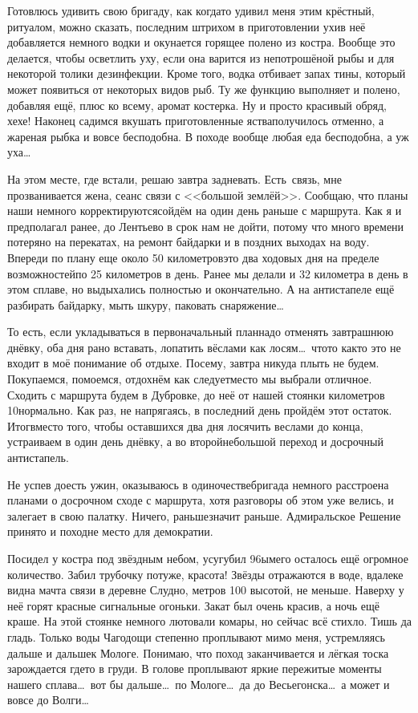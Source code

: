 Готовлюсь удивить свою бригаду, как когда\sdash то удивил меня этим крёстный, ритуалом, можно сказать, последним штрихом в приготовлении ухи\mdash в неё добавляется немного водки и окунается горящее полено из костра. Вообще это делается, чтобы осветлить уху, если она варится из непотрошёной рыбы и для некоторой толики дезинфекции. Кроме того, водка отбивает запах тины, который может появиться от некоторых видов рыб. Ту же функцию выполняет и полено, добавляя ещё, плюс ко всему, аромат костерка. Ну и просто красивый обряд, хе\sdash хе! Наконец садимся вкушать приготовленные яства\mdash получилось отменно, а жареная рыбка и вовсе бесподобна. В походе вообще любая еда бесподобна, а уж уха\ldots~

На этом месте, где встали, решаю завтра задневать. Есть~связь, мне прозванивается жена, сеанс связи с <<большой землёй>>. Сообщаю, что планы наши немного корректируются\mdash сойдём на один день раньше с маршрута. Как я и предполагал ранее, до Лентьево в срок нам не дойти, потому что много времени потеряно на перекатах, на ремонт байдарки и в поздних выходах на воду. Впереди по плану еще около 50 километров\mdash это два ходовых дня на пределе возможностей\mdash по 25 километров в день. Ранее мы делали и 32 километра в день в этом сплаве, но выдыхались полностью и окончательно. А на антистапеле ещё разбирать байдарку, мыть шкуру, паковать снаряжение\ldots~

То есть, если укладываться в первоначальный план\mdash надо отменять завтрашнюю днёвку, оба дня рано вставать, лопатить вёслами как лосям\ldots~что\sdash то как\sdash то это не входит в моё понимание об отдыхе. Посему, завтра никуда плыть не будем. Покупаемся, помоемся, отдохнём как следует\mdash место мы выбрали отличное. Сходить с маршрута будем в Дубровке, до неё от нашей стоянки километров 10\mdash нормально. Как раз, не напрягаясь, в последний день пройдём этот остаток. Итог\mdash вместо того, чтобы оставшихся два дня лосячить веслами до конца, устраиваем в один день днёвку, а во второй\mdash небольшой переход и досрочный антистапель. 

Не успев доесть ужин, оказываюсь в одиночестве\mdash бригада немного расстроена планами о досрочном сходе с маршрута, хотя разговоры об этом уже велись, и залегает в свою палатку. Ничего, раньше\mdash значит раньше. Адмиральское Решение принято и поход\mdash не место для демократии. 

Посидел у костра под звёздным небом, усугубил 96\sdash ым\mdash его осталось ещё огромное количество. Забил трубочку потуже, красота! Звёзды отражаются в воде, вдалеке видна мачта связи в деревне Слудно, метров 100 высотой, не меньше. Наверху у неё горят красные сигнальные огоньки. Закат был очень красив, а ночь ещё краше. На этой стоянке немного лютовали комары, но сейчас всё стихло. Тишь да гладь. Только воды Чагодощи степенно проплывают мимо меня, устремляясь дальше и дальше\mdash к Мологе. Понимаю, что поход заканчивается и лёгкая тоска зарождается где\sdash то в груди. В голове проплывают яркие пережитые моменты нашего сплава\ldots~вот бы дальше\ldots~по Мологе\ldots~да до Весьегонска\ldots~а может и вовсе до Волги\ldots~

\begin{center}
\end{center}